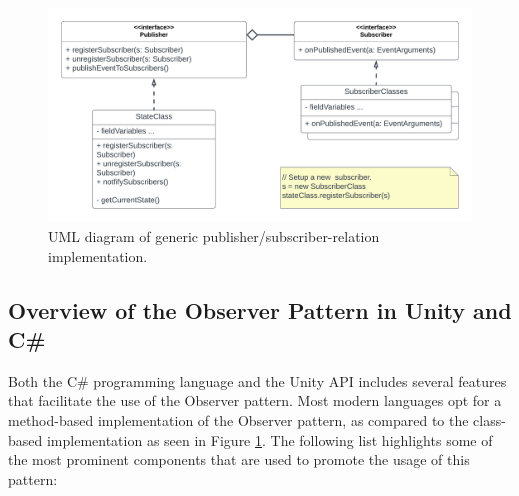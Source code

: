     \begin{figure}[ht]
      \centering
      \includegraphics[scale=0.6]{Project_report/figures/theory/design_patterns/observer_uml.png}
      \caption{UML diagram of generic publisher/subscriber-relation implementation.}
      \label{fig:subscriber-observer-uml}
    \end{figure}

\subsection{Overview of the Observer Pattern in Unity and C\#}
    Both the C\# programming language and the Unity API includes several features that facilitate the use of the Observer pattern. Most modern languages opt for a method-based implementation of the Observer pattern, as compared to the class-based implementation as seen in Figure \ref{fig:subscriber-observer-uml}. The following list highlights some of the most prominent components that are used to promote the usage of this pattern:

